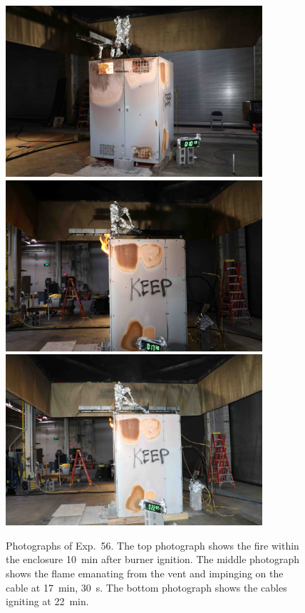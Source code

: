 \begin{figure}[p]
\centering
\includegraphics[height=2.50in]{../FIGURES/Test_56_10_min_13_s} \\ \vspace{0.1in}
\includegraphics[height=2.50in]{../FIGURES/Test_56_17_min_30_s} \\ \vspace{0.1in}
\includegraphics[height=2.50in]{../FIGURES/Test_56_22_min_5_s}
\caption[Photographs of Exp.~56]{Photographs of Exp.~56. The top photograph shows the fire within the enclosure 10~min after burner ignition. The middle photograph shows the flame emanating from the vent and impinging on the cable at 17~min, 30~s. The bottom photograph shows the cables igniting at 22~min.}
\label{fig:Test_56_photos}
\end{figure}


